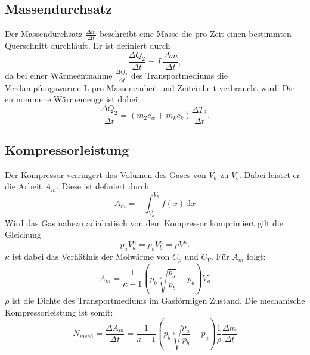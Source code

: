 \subsection{Massendurchsatz}
Der Massendurchsatz $\frac{\Delta m}{\Delta t}$ beschreibt eine Masse die pro Zeit einen bestimmten Querschnitt durchläuft.
Er ist definiert durch
\begin{equation}
  \frac{\Delta Q_2}{\Delta t} = L\frac{\Delta m}{\Delta t} ,
\end{equation}
da bei einer Wärmeentnahme $\frac{\Delta Q_2}{\Delta t}$ des Transportmediums die Verdampfungswärme L pro Masseneinheit und Zeiteinheit
verbraucht wird. Die entnommene Wärmemenge ist dabei
\begin{equation}
  \frac{\Delta Q_2}{\Delta t} = (m_2c_w + m_kc_k)\frac{\Delta T_2}{\Delta t} .
\end{equation}
\subsection{Kompressorleistung}
Der Kompressor verringert das Volumen des Gases von $V_a$ zu $V_b$. Dabei leistet
er die Arbeit $A_m$. Diese ist definiert durch
\begin{equation}
  A_m = - \int_{V_a}^{V_b} f(x) \, \mathrm{d}x
\end{equation}
Wird das Gas nahezu adiabatisch von dem Kompressor komprimiert gilt die Gleichung
\begin{equation}
  p_a V_a^\kappa = p_b V_b^\kappa = pV^\kappa.
\end{equation}
$\kappa$ ist dabei das Verhätlnis der Molwärme von $C_p$ und $C_V$.
Für $A_m$ folgt:
\begin{equation}
  A_m = \frac{1}{\kappa -1}\left(p_b\sqrt[\kappa]{\frac{p_a}{p_b}}-p_a\right)V_a
\end{equation}
$\rho$ ist die Dichte des Transportmediums im Gasförmigen Zustand. Die mechanische Kompressorleistung
ist somit:
\begin{equation}
  N_{mech} = \frac{\Delta A_m}{\Delta t} = \frac{1}{\kappa -1} \left(p_b \sqrt[\kappa]{\frac{p_a}{p_b}}-p_a\right)\frac{1}{\rho}\frac{\Delta m}{\Delta t}
\end{equation}
\label{sec:Theorie}
